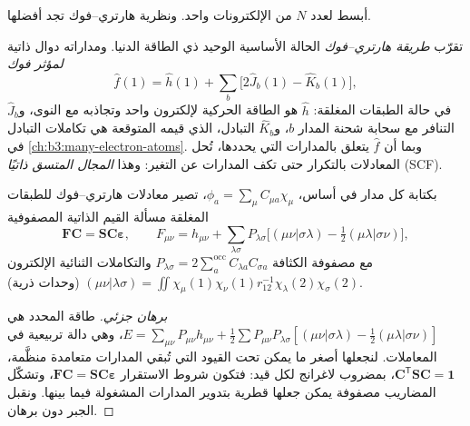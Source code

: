 أبسط  لعدد $N$ من الإلكترونات 
واحد. ونظرية هارتري--فوك تجد أفضلها.

\begin{definition}\label{def:b3:computational-chemistry:hartree-fock}
تقرّب \emph{طريقة هارتري--فوك}
الحالة الأساسية  الوحيد ذي الطاقة الدنيا. ومداراته
دوال ذاتية \emph{لمؤثر فوك}
\[
\hat f(1) = \hat h(1) + \sum_b\big[2\hat J_b(1) - \hat K_b(1)\big],
\]
في حالة الطبقات المغلقة: $\hat h$ هو الطاقة الحركية لإلكترون واحد وتجاذبه مع
النوى، و$\hat J_b$ التنافر مع سحابة شحنة
المدار $b$، و$\hat K_b$  التبادل، الذي قيمه المتوقعة هي
تكاملات التبادل في \cref{ch:b3:many-electron-atoms}. وبما أن $\hat f$
يتعلق بالمدارات التي يحددها، تُحل المعادلات
بالتكرار حتى تكف المدارات عن التغير: وهذا \emph{المجال المتسق
ذاتيًا} (SCF).
\end{definition}

\begin{theorem}\label{thm:b3:computational-chemistry:roothaan}
بكتابة كل مدار في أساس، $\phi_a = \sum_\mu C_{\mu a}\chi_\mu$، تصير
معادلات هارتري--فوك للطبقات المغلقة مسألة القيم الذاتية المصفوفية
\[
\mathbf F\mathbf C = \mathbf S\mathbf C\boldsymbol\varepsilon, \qquad F_{\mu\nu} =
h_{\mu\nu} + \sum_{\lambda\sigma}P_{\lambda\sigma}\big[(\mu\nu|\sigma\lambda) -
\tfrac12(\mu\lambda|\sigma\nu)\big],
\]
مع مصفوفة الكثافة $P_{\lambda\sigma} = 2\sum_a^{\mathrm{occ}}C_{\lambda a}C_{\sigma
a}$ والتكاملات الثنائية الإلكترون $(\mu\nu|\lambda\sigma) = \iint\chi_\mu(1)\chi_\nu(1)
r_{12}^{-1}\chi_\lambda(2)\chi_\sigma(2)$ (وحدات ذرية).
\end{theorem}

\begin{proof}[برهان جزئي]
طاقة المحدد هي $E = \sum_{\mu\nu}P_{\mu\nu}h_{\mu\nu} + \frac12
\sum P_{\mu\nu}P_{\lambda\sigma}[(\mu\nu|\sigma\lambda) - \frac12(\mu\lambda|\sigma\nu)]$، وهي
دالة تربيعية في المعاملات. لنجعلها أصغر ما يمكن تحت القيود
التي تُبقي المدارات متعامدة منظَّمة، $\mathbf C^{\mathsf T}\mathbf S\mathbf C = \mathbf 1$،
بمضروب لاغرانج لكل قيد: فتكون شروط
الاستقرار $\mathbf F\mathbf C = \mathbf S\mathbf C\boldsymbol\varepsilon$، 
وتشكّل المضاريب مصفوفة يمكن جعلها قطرية بتدوير
المدارات المشغولة فيما بينها. ونقبل الجبر دون برهان.
\end{proof}

